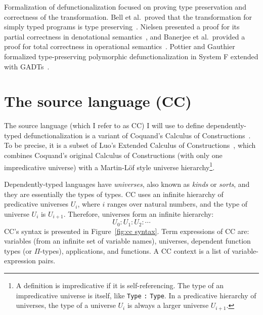 
Formalization of defunctionalization focused on proving type preservation and correctness of the transformation. Bell et al.~proved that the transformation for simply typed programs is type preserving~\cite{DBLP:conf/icfp/BellBH97}.  Nielsen presented a proof for its partial correctness in denotational semantics~\cite{nielsen2000denotational}, and Banerjee et al.~provided a proof for total correctness in operational semantics~\cite{DBLP:conf/tacs/BanerjeeHR01}. Pottier and Gauthier formalized type-preserving polymorphic defunctionalization in System F extended with GADTs~\cite{DBLP:conf/popl/PottierG04}.

\section{The source language (CC)}
\label{sec:2.2}

The source language (which I refer to as CC) I will use to define dependently-typed defunctionalization is a variant of Coquand’s Calculus of Constructions~\cite{DBLP:journals/iandc/CoquandH88}. To be precise, it is a subset of Luo's Extended Calculus of Constructions~\cite{DBLP:phd/ethos/Luo90}, which combines Coquand's original Calculus of Constructions (with only one impredicative universe) with a Martin-Löf style universe hierarchy\footnote{A definition is impredicative if it is self-referencing. The type of an impredicative universe is itself, like \texttt{Type} \texttt{:} \texttt{Type}. In a predicative hierarchy of universes, the type of a universe $U_i$ is always a larger universe $U_{i+1}$. 
}. 

Dependently-typed languages have \textit{universes}, also known as \textit{kinds} or \textit{sorts}, and they are essentially the types of types. CC uses an infinite hierarchy of predicative universes $U_i$, where $i$ ranges over natural numbers, and the type of universe $U_i$ is $U_{i+1}$. Therefore, universes form an infinite hierarchy:
\begin{equation*}
U_0 \mathrel{:} U_1 \mathrel{:} U_2 \mathrel{:} \cdots
\end{equation*}
CC's syntax is presented in Figure~\ref{fig:cc syntax}. Term expressions of CC are: variables (from an infinite set of variable names), universes, dependent function types (or $\Pi$-types), applications, and functions. A CC context is a list of variable-expression pairs.

